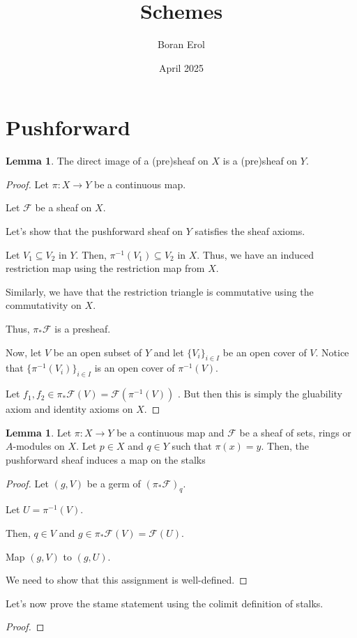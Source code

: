 \documentclass{article}
\title{Schemes}
\date{April 2025}
\author{Boran Erol}
\theoremstyle{definition}
\newtheorem{lemma}[theorem]{Lemma}
\begin{document}
\maketitle

\section{Pushforward}

\begin{lemma}
    The direct image of a (pre)sheaf on $ X $ is a (pre)sheaf on $ Y $.
\end{lemma}
\begin{proof}
    Let $ \pi: X \to Y $ be a continuous map.

    Let $ \mathcal{F} $ be a sheaf on $ X $.
    
    Let's show that the pushforward sheaf on $ Y $ satisfies
    the sheaf axioms.
    
    Let $ V_{1} \subseteq V_{2} $ in $ Y $.
    Then, $ \pi^{-1}(V_{1}) \subseteq V_{2} $ in $ X $.
    Thus, we have an induced restriction map using the restriction map from $ X $.
    
    Similarly, we have that the restriction triangle is commutative using the commutativity on $ X $.
    
    Thus, $ \pi_{*} \mathcal{F} $ is a presheaf.
    
    Now, let $ V $ be an open subset of $ Y $ and let $ \{ V_{i} \}_{i \in I } $
    be an open cover of $ V $. Notice that $ \{ \pi^{-1}(V_{i}) \}_{i \in I } $ is an
    open cover of $ \pi^{-1}(V) $.
    
    Let $ f_{1}, f_{2} \in \pi_{*} \mathcal{F}(V) = \mathcal{F}(\pi^{-1}(V))$ .
    But then this is simply the gluability axiom and identity axioms on $ X $.
\end{proof}


\begin{lemma}
    Let $ \pi: X \to Y $ be a continuous map and $ \mathcal{F} $ be a sheaf of sets,
    rings or $ A $-modules on $ X $. Let $ p \in X $ and $ q \in Y $ such that $ \pi(x) = y $.
    Then, the pushforward sheaf induces a map on the stalks
\end{lemma}
\begin{proof}
    Let $ (g, V) $ be a germ of $ (\pi_{*} \mathcal{F})_{q} $.

    Let $ U = \pi^{-1}(V) $.

    Then, $ q \in V $ and $ g \in \pi_{*} \mathcal{F}(V) = \mathcal{F}(U)$.

    Map $ (g, V) $ to $ (g, U) $.

    We need to show that this assignment is well-defined.


\end{proof}

Let's now prove the stame statement using the colimit definition of stalks.

\begin{proof}
    
\end{proof}
\end{document}
